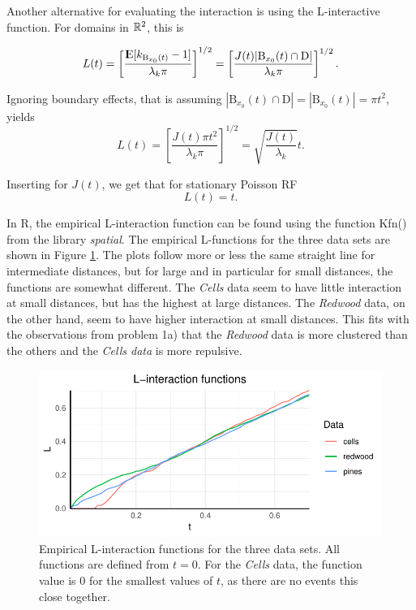 Another alternative for evaluating the interaction is using the L-interactive function. For domains in $\mathbb{R}^2$, this is

\begin{equation}
    L(t) = \left[\frac{{\rm I\kern-.3em E}{[k_{\textrm{B}_{x_0}(t)}-1]}}{\lambda_k \pi}\right]^{1/2} = \left[\frac{J(t)|\textrm{B}_{x_0}(t) \cap \textrm{D}|}{\lambda_k \pi}\right]^{1/2}.
\end{equation}

Ignoring boundary effects, that is assuming $|\textrm{B}_{x_0}(t) \cap \textrm{D}| = |\textrm{B}_{x_0}(t)| = \pi t^2$, yields
\begin{equation}
    L(t) = \left[\frac{J(t)\pi t^2}{\lambda_k \pi}\right]^{1/2} = \sqrt{\frac{J(t)}{\lambda_k}}t .
    \label{eq:L_function}
\end{equation}

Inserting for $J(t)$, we get that for stationary Poisson RF
\begin{equation}
    L(t) = t.
\end{equation}

In R, the empirical L-interaction function can be found using the function Kfn() from the library \textit{spatial}. The empirical L-functions for the three data sets are shown in Figure \ref{fig:L_emp}. The plots follow more or less the same straight line for intermediate distances, but for large and in particular for small distances, the functions are somewhat different. The \textit{Cells} data seem to have little interaction at small distances, but has the highest at large distances. The \textit{Redwood} data, on the other hand, seem to have higher interaction at small distances. This fits with the observations from problem 1a) that the \textit{Redwood} data is more clustered than the others and the \textit{Cells data} is more repulsive. 

\begin{figure}
    \centering
    \includegraphics[scale=0.9]{figures/prob1_L_empirical.pdf}
    \caption{Empirical L-interaction functions for the three data sets. All functions are defined from $t = 0$. For the \textit{Cells} data, the function value is $0$ for the smallest values of $t$, as there are no events this close together.}
    \label{fig:L_emp}
\end{figure}

